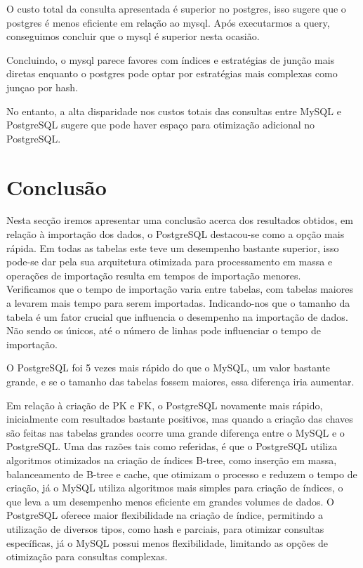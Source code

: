 \documentclass{article}
\begin{document}
O custo total da consulta apresentada é superior no postgres, isso sugere que o postgres é menos eficiente em relação ao mysql. Após executarmos a query, conseguimos concluir que o mysql é superior nesta ocasião.

Concluindo, o mysql parece favores com índices e estratégias de junção mais diretas enquanto o postgres pode optar por estratégias mais complexas como junçao por hash.

No entanto, a alta disparidade nos custos totais das consultas entre MySQL e PostgreSQL sugere que pode haver espaço para otimização adicional no PostgreSQL.
\clearpage
\section{Conclusão}

\texttt{}\par Nesta secção iremos apresentar uma conclusão acerca dos resultados obtidos, em relação à importação dos dados, o PostgreSQL destacou-se como a opção mais rápida. Em todas as tabelas este teve um desempenho bastante superior, isso pode-se dar pela sua arquitetura otimizada para processamento em massa e operações de importação resulta em tempos de importação menores. \\

Verificamos que o tempo de importação varia entre tabelas, com tabelas maiores a levarem mais tempo para serem importadas. Indicando-nos que o tamanho da tabela é um fator crucial que influencia o desempenho na importação de dados. Não sendo os únicos, até o número de linhas pode influenciar o tempo de importação.

O PostgreSQL foi 5 vezes mais rápido do que o MySQL, um valor bastante grande, e se o tamanho das tabelas fossem maiores, essa diferença iria aumentar.

Em relação à criação de PK e FK, o PostgreSQL novamente mais rápido, inicialmente com resultados bastante positivos, mas quando a criação das chaves são feitas nas tabelas grandes ocorre uma grande diferença entre o MySQL e o PostgreSQL. Uma das razões tais como referidas, é que o PostgreSQL utiliza algoritmos otimizados na criação de índices B-tree, como inserção em massa, balanceamento de B-tree e cache, que otimizam o processo e reduzem o tempo de criação, já o MySQL utiliza algoritmos mais simples para criação de índices, o que leva a um desempenho menos eficiente em grandes volumes de dados. O PostgreSQL oferece maior flexibilidade na criação de índice, permitindo a utilização de diversos tipos, como hash e parciais, para otimizar consultas específicas, já o MySQL possui menos flexibilidade, limitando as opções de otimização para consultas complexas.
\end{document}
